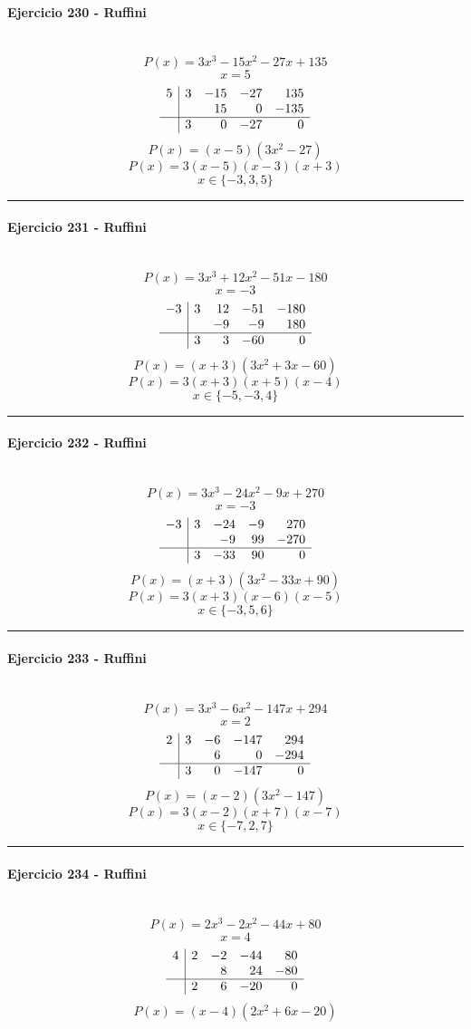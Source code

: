 \documentclass[10pt,a4paper]{article}
\newcommand{\res}[1]{\paragraph{#1}\mbox{}\\[-1.2em]}
\begin{document}
\res{Ejercicio 230 - Ruffini}
\[ P(x)=3 x^{3} - 15 x^{2} - 27 x + 135 \]
\[ x=5 \]
\[\begin{array}{r|rrrr}5 & 3 & -15 & -27 & 135\\  &  & 15 & 0 & -135\\\hline  & 3 & 0 & -27 & 0\end{array}\]
\[ P(x)=(x-5)(3 x^{2} - 27) \]
\[ P(x)=3(x-5)(x-3)(x+3) \]
\[ \boxed{x\in\{-3,3,5\}} \]
\vspace{1mm}\hrule\vspace{2mm}
\res{Ejercicio 231 - Ruffini}
\[ P(x)=3 x^{3} + 12 x^{2} - 51 x - 180 \]
\[ x=-3 \]
\[\begin{array}{r|rrrr}-3 & 3 & 12 & -51 & -180\\  &  & -9 & -9 & 180\\\hline  & 3 & 3 & -60 & 0\end{array}\]
\[ P(x)=(x+3)(3 x^{2} + 3 x - 60) \]
\[ P(x)=3(x+3)(x+5)(x-4) \]
\[ \boxed{x\in\{-5,-3,4\}} \]
\vspace{1mm}\hrule\vspace{2mm}
\res{Ejercicio 232 - Ruffini}
\[ P(x)=3 x^{3} - 24 x^{2} - 9 x + 270 \]
\[ x=-3 \]
\[\begin{array}{r|rrrr}-3 & 3 & -24 & -9 & 270\\  &  & -9 & 99 & -270\\\hline  & 3 & -33 & 90 & 0\end{array}\]
\[ P(x)=(x+3)(3 x^{2} - 33 x + 90) \]
\[ P(x)=3(x+3)(x-6)(x-5) \]
\[ \boxed{x\in\{-3,5,6\}} \]
\vspace{1mm}\hrule\vspace{2mm}
\res{Ejercicio 233 - Ruffini}
\[ P(x)=3 x^{3} - 6 x^{2} - 147 x + 294 \]
\[ x=2 \]
\[\begin{array}{r|rrrr}2 & 3 & -6 & -147 & 294\\  &  & 6 & 0 & -294\\\hline  & 3 & 0 & -147 & 0\end{array}\]
\[ P(x)=(x-2)(3 x^{2} - 147) \]
\[ P(x)=3(x-2)(x+7)(x-7) \]
\[ \boxed{x\in\{-7,2,7\}} \]
\vspace{1mm}\hrule\vspace{2mm}
\res{Ejercicio 234 - Ruffini}
\[ P(x)=2 x^{3} - 2 x^{2} - 44 x + 80 \]
\[ x=4 \]
\[\begin{array}{r|rrrr}4 & 2 & -2 & -44 & 80\\  &  & 8 & 24 & -80\\\hline  & 2 & 6 & -20 & 0\end{array}\]
\[ P(x)=(x-4)(2 x^{2} + 6 x - 20) \]
\end{document}
